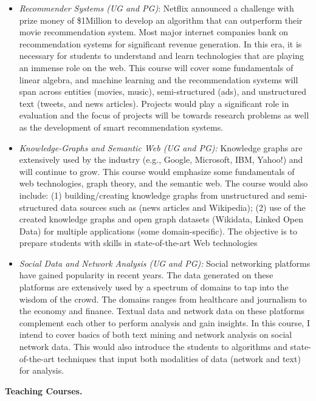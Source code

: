 \documentclass[12pt]{letter} %
\begin{document}
\begin{itemize}
\item \textit{Recommender Systems (UG and PG)}: Netflix announced a challenge with prize money of \$1Million to develop an algorithm that can outperform their movie recommendation system. Most major internet companies bank on recommendation systems for significant revenue generation. In this era, it is necessary for students to understand and learn technologies that are playing an immense role on the web. This course will cover some fundamentals of linear algebra, and machine learning and the recommendation systems will span across entities (movies, music), semi-structured (ads), and unstructured text (tweets, and news articles). Projects would play a significant role in evaluation and the focus of projects will be towards research problems as well as the development of smart recommendation systems.

   
\item \textit{Knowledge-Graphs and Semantic Web (UG and PG):} Knowledge graphs are extensively used by the industry (e.g., Google, Microsoft, IBM, Yahoo!) and will continue to grow. This course would emphasize some fundamentals of web technologies, graph theory, and the semantic web. The course would also include: (1) building/creating knowledge graphs from unstructured and semi-structured data sources such as (news articles and Wikipedia); (2) use of the created knowledge graphs and open graph datasets (Wikidata, Linked Open Data) for multiple applications (some domain-specific). The objective is to prepare students with skills in state-of-the-art Web technologies

\item \textit{Social Data and Network Analysis (UG and PG): } Social networking platforms have gained popularity in recent years. The data generated on these platforms are extensively used by a spectrum of domains to tap into the wisdom of the crowd. The domains ranges from healthcare and journalism to the economy and finance. Textual data and network data on these platforms complement each other to perform analysis and gain insights. In this course, I intend to cover basics of both text mining and network analysis on social network data. This would also introduce the students to algorithms and state-of-the-art techniques that input both modalities of data (network and text) for analysis.  
\end{itemize}

\vspace{1.0em} 
\textbf{Teaching Courses.}
\vspace{0.3em}
\end{document}
